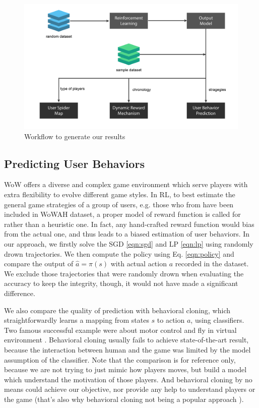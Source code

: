 \documentclass{sigchi}
\begin{document}
\begin{figure}[t]
    \centering
    \includegraphics[width=\textwidth]{figs/results.jpg}
    \caption{Workflow to generate our results}
    \label{fig:results}
\end{figure}

\subsection{Predicting User Behaviors}

WoW offers a diverse and complex game environment which serve players with extra flexibility to evolve different game styles.
In RL, to best estimate the general game strategies of a group of users, e.g. those who from have been included in WoWAH dataset, a proper model of reward function is called for rather than a heuristic one.
In fact, any hand-crafted reward function would bias from the actual one, and thus leads to a biased estimation of user behaviors.
In our approach, we firstly solve the SGD \eqref{eqn:sgd} and LP \eqref{eqn:lp} using randomly drown trajectories. 
We then compute the policy using Eq. \eqref{eqn:policy} and compare the output of $\hat{a}=\pi(s)$ with actual action $a$ recorded in the dataset.
We exclude those trajectories that were randomly drown when evaluating the accuracy to keep the integrity, though, it would not have made a significant difference.

We also compare the quality of prediction with behavioral cloning, which straightforwardly learns a mapping from states $s$ to action $a$, using classifiers. 
Two famous successful example were about motor control \cite{amit2002parametric} and fly in virtual environment \cite{sammut1992learning}.
Behavioral cloning usually fails to achieve state-of-the-art result, because the interaction between human and the game was limited by the model assumption of the classifier.
Note that the comparison is for reference only, because we are not trying to just mimic how players moves, but build a model which understand the motivation of those players.
And behavioral cloning by no means could achieve our objective, nor provide any help to understand players or the game (that's also why behavioral cloning not being a popular approach \cite{argall2009survey}).
\end{document}
